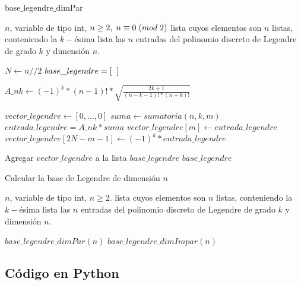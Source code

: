 \begin{algorithm}
\caption{base$\_$legendre$\_$dimPar}\label{alg: legendre Par}
\begin{algorithmic} [1]
\REQUIRE $n$, variable de tipo int, $n \geq 2, \hspace{0.1cm} n \equiv 0 \hspace{0.1cm} (mod \hspace{0.1cm} 2)$
\ENSURE lista cuyos elementos son $n$ listas, conteniendo
la $k-$ésima lista las $n$ entradas del polinomio discreto de Legendre de
grado $k$ y dimensión $n$.


\STATE $N \leftarrow n//2$
\STATE $base\_legendre=[ \hspace{0.2cm} ]$

\STATE $A\_nk \leftarrow (-1)^{k}*(n-1)!*
\sqrt{\frac{
2k+1
}{
(n-k-1)!*(n+k)!
}}$

\STATE $vector\_legendre \leftarrow [ 0, \ldots , 0]$  
\STATE $suma \leftarrow sumatoria(n,k,m)$
\STATE $entrada\_legendre=A\_nk * suma$
\STATE $vector\_legendre[m] \leftarrow entrada\_legendre$ 
\STATE $vector\_legendre[2N-m-1] \leftarrow (-1)^{k}*entrada\_legendre$
\ENDFOR


\STATE Agregar $vector\_legendre$ a la lista $base\_legendre$
\ENDFOR
\RETURN $base\_legendre$
\end{algorithmic}
\end{algorithm}



\begin{algorithm}
\caption{Calcular la base de Legendre de dimensión $n$}
\begin{algorithmic} [1]
\REQUIRE $n$, variable de tipo int, $n \geq 2$.
\ENSURE lista cuyos elementos son $n$ listas, conteniendo
la $k-$ésima lista las $n$ entradas del polinomio discreto de Legendre de
grado $k$ y dimensión $n$.

\STATE $base\_legendre\_dimPar(n)$
\ELSE
\STATE $base\_legendre\_dimImpar(n)$
\ENDIF
\end{algorithmic}
\end{algorithm}

\subsection{Código en Python}


